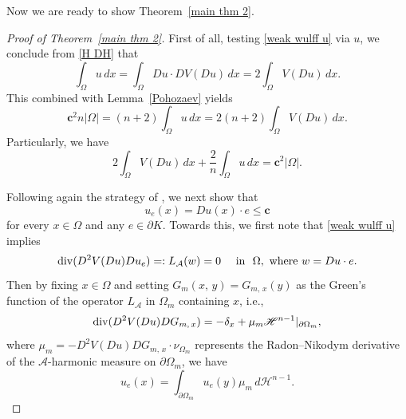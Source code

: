 \documentclass[reqno,11pt]{amsart}
\numberwithin{equation}{section}
\theoremstyle{remark}
\begin{document}
Now we are ready to show Theorem~\ref{main thm 2}. 
\begin{proof}[Proof of Theorem~\ref{main thm 2}]
First of all, testing \eqref{weak wulff u} via $u$, we conclude from \eqref{H DH} that
$$\int_{\Omega} u\, dx = \int_{\Omega} Du\cdot DV(Du)\, dx= 2 \int_{\Omega} V(Du)\, dx.$$
This combined with Lemma~\ref{Pohozaev} yields
\begin{equation}\label{identity 1} 
\mathbf{c}^2 n|\Omega|=(n+2)\int_{\Omega} u\, dx = 2(n+2) \int_{\Omega} V(Du)\, dx.   
\end{equation}
Particularly, we have
\begin{equation}\label{identity 2}
 2\int_{\Omega} V(Du) \, dx +\frac{2}{n} \int_{\Omega} u\,dx = \mathbf{c}^2|\Omega|.     
\end{equation}



Following again the strategy of \cite[Proposition 3.3]{FZ2025},  we next show that
\begin{equation}\label{Du e}
u_e(x)=Du(x)\cdot e\le \mathbf c
\end{equation}
for every $x\in \Omega$ and any $e\in \partial K$. Towards this, we first note that \eqref{weak wulff u} implies
$${\rm div}(D^2V(Du) Du_e)=:L_\mathcal A(w)=0 \quad  \text{ in } \ \Omega, \  \text{where $w=Du\cdot e$}.$$
Then by fixing $x\in \Omega$ and setting $G_{m}(x,\,y)=G_{m,\,x}(y)$ as the Green's function of the operator $L_\mathcal A$ in $\Omega_m$ containing   $x$, i.e.,
$${\rm div}(D^2V(Du) DG_{m,\,{x}})=-\delta_{x} + \mu_m\mathscr H^{n-1}|_{\partial\Omega_m},$$
where $\mu_m=-D^2V(Du)DG_{m,\,x}\cdot \nu_{\Omega_{m}}$ represents the Radon--Nikodym derivative of the $\mathcal A$-harmonic measure on $\partial \Omega_m$,
we have
\begin{equation}\label{ue}
    u_e(x)=\int_{\partial\Omega_m}   u_e (y)\mu_m\,d\mathscr H^{n-1}.
\end{equation}


\end{proof}
\end{document}
